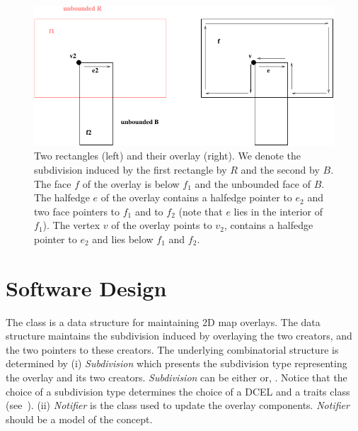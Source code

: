 \begin{figure}[h]
    \begin{ccTexOnly}
        \centerline{
           \includegraphics{Map_overlay_2/overlay_example}
           }
    \end{ccTexOnly}
    \caption{Two rectangles (left) and their overlay (right). 
       We denote the subdivision induced by the first rectangle by $R$ and the second by $B$. 
       The face $f$ of the overlay is below $f_1$ and the unbounded face of $B$. 
       The halfedge $e$ of the overlay contains a halfedge pointer to $e_2$ and two face pointers 
       to $f_1$ and to $f_2$ (note that $e$ lies in the interior of $f_1$). 
       The vertex $v$ of the overlay points to $v_2$, contains a halfedge 
       pointer to $e_2$ and lies below $f_1$ and $f_2$.}
    \label{fig:overlay_example}
\end{figure}


\section{Software Design}
The  class 
is a data structure for maintaining 2D map overlays.
The data structure maintains the subdivision induced by overlaying 
the two creators, and the two pointers to these creators. 
The underlying combinatorial structure is determined by
(i) {\it Subdivision} which presents the subdivision type 
representing the overlay and its two creators. 
{\it Subdivision} can be either  or, 
 .
Notice that the choice of a subdivision type determines the choice 
of a DCEL and a traits class (see~).
(ii) {\it Notifier} is the class used to update the overlay components. 
{\it Notifier} should be a model of the 
 concept.

